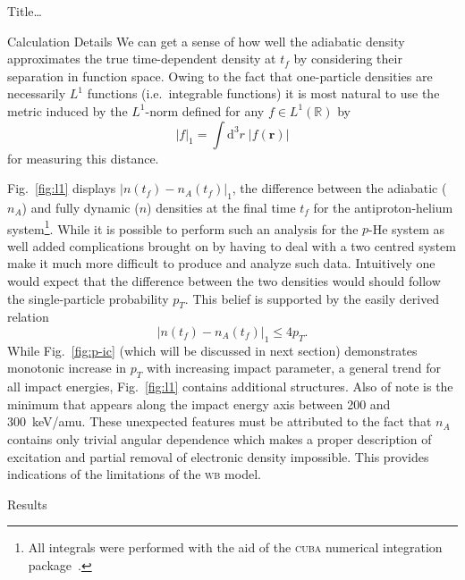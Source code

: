 \documentclass[letterpaper, 11 pt]{report}
\begin{document}
\begin{chapter}{ Title\dots \label{chap:p-he2p-he}}
\begin{section}{Calculation Details \label{sec:phe2p-det}}
      We can get a sense of how well the adiabatic density approximates the true time-dependent density
      at $t_f$ by considering their separation in function space. Owing to the fact that one-particle
      densities are necessarily $L^1$ functions (i.e.\ integrable functions) it is most natural to use
      the metric induced by the $L^1$-norm defined for any
      $f \in L^1\left(\mathbb{R}\right)$ by
      \begin{equation} \label{eq:l1rorm}
         \left| f \right|_1 = \int \mathrm{d}^3 r \; \left| f(\mathbf{r}) \right|
      \end{equation}
      for measuring this distance.
      
      Fig.~\ref{fig:l1} displays $\left| n(t_f) - n_A(t_f) \right|_1$, the difference between the
      adiabatic ($n_A$) and fully dynamic ($n$) densities at the final time $t_f$ for the
      antiproton-helium system\footnote{All integrals were performed with the aid of the \textsc{cuba}
      numerical integration package~\cite{cuba}.}. While it is possible to perform such an analysis for
      the $p$-He system as well added complications brought on by having to deal with a two centred
      system make it much more difficult to produce and analyze such data. Intuitively one would expect
      that the difference between the two densities would should follow the single-particle probability
      $p_T$. This belief is supported by the easily derived relation 
      \begin{equation} \label{eq:diff-bound}
         \left| n(t_f) - n_A(t_f) \right|_1 \leq 4 p_T.
      \end{equation}
      While Fig.~\ref{fig:p-ic} (which will be discussed in next section) demonstrates monotonic
      increase in $p_T$ with increasing impact parameter, a general trend for all impact energies,
      Fig.~\ref{fig:l1} contains additional structures. Also of note is the minimum that appears along
      the impact energy axis between 200 and 300~keV/amu. These unexpected features must be attributed
      to the fact that $n_A$ contains only trivial angular dependence which makes a proper description
      of excitation and partial removal of electronic density impossible. This provides indications of
      the limitations of the \textsc{wb} model.

   \end{section}

   \begin{section}{Results \label{sec:phe2p-res}}


\end{section}
\end{chapter}
\end{document}
